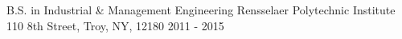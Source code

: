 

\begin{cventries}

  \cventry
    {B.S. in Industrial \& Management Engineering} %
    {Rensselaer Polytechnic Institute} %
    {110 8th Street, Troy, NY, 12180} %
    {2011 - 2015} %
    {
    }
\vspace{-0.7cm}
\end{cventries}
